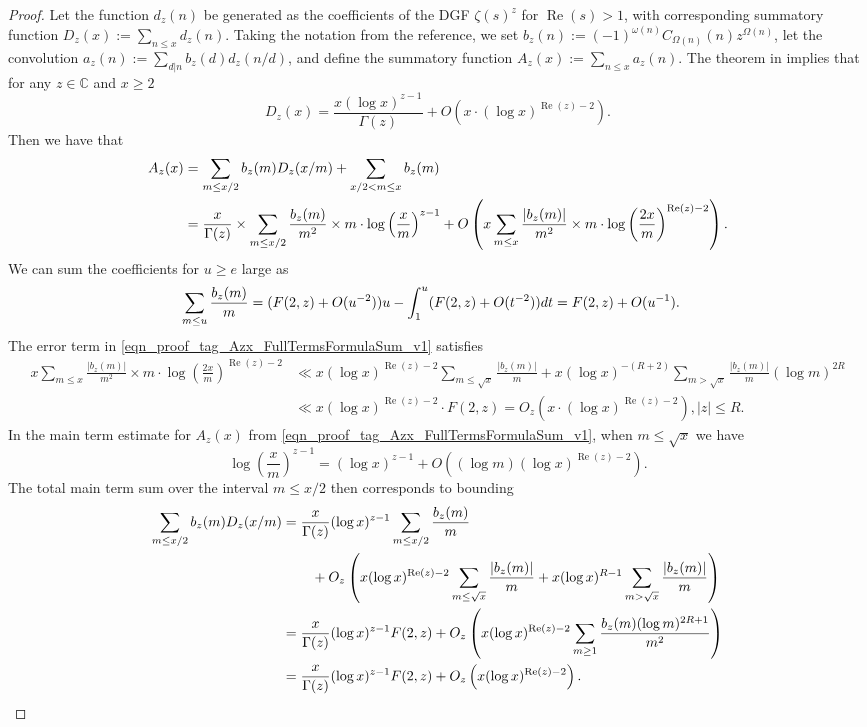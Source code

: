 \documentclass[11pt,reqno,a4letter]{article}
\numberwithin{figure}{section}
\numberwithin{table}{section}
\theoremstyle{plain}
\numberwithin{theorem}{section}
\theoremstyle{definition}
\renewcommand{\Re}{\operatorname{Re}}
\begin{document}
\begin{proof}
Let the function $d_z(n)$ be generated as the coefficients of the DGF 
$\zeta(s)^{z}$ for $\Re(s) > 1$, with corresponding 
summatory function $D_z(x) := \sum_{n \leq x} d_z(n)$. 
Taking the notation from the reference, we set 
$b_z(n) := (-1)^{\omega(n)} C_{\Omega(n)}(n) z^{\Omega(n)}$, let the convolution 
$a_z(n) := \sum_{d|n} b_z(d) d_z(n/d)$, and define the summatory function 
$A_z(x) := \sum_{n \leq x} a_z(n)$. 
The theorem in \cite[Thm.\ 7.17; \S 7.4]{MV} implies that for any $z \in \mathbb{C}$ and $x \geq 2$ 
\[
D_z(x) = \frac{x (\log x)^{z-1}}{\Gamma(z)} + O\left(x \cdot (\log x)^{\Re(z)-2}\right). 
\]
Then we have that 
\begin{align} 
\notag 
A_z(x) & = \sum_{m \leq x/2} b_z(m) D_z(x/m) + \sum_{x/2 < m \leq x} b_z(m) \\ 
\label{eqn_proof_tag_Azx_FullTermsFormulaSum_v1} 
     & = \frac{x}{\Gamma(z)} \times \sum_{m \leq x/2} 
     \frac{b_z(m)}{m^2} \times m \cdot \log\left(\frac{x}{m}\right)^{z-1} + 
     O\left(x \sum_{m \leq x} \frac{|b_z(m)|}{m^2} \times m \cdot 
     \log\left(\frac{2x}{m}\right)^{\Re(z) - 2}\right). 
\end{align} 
We can sum the coefficients for $u \geq e$ large as 
\begin{align} 
\notag 
\sum_{m \leq u} \frac{b_z(m)}{m} & = (F(2, z) + O(u^{-2})) u - \int_1^{u} 
     (F(2, z) + O(t^{-2})) dt 
     = F(2, z) + O(u^{-1}). 
\end{align} 
The error term in \eqref{eqn_proof_tag_Azx_FullTermsFormulaSum_v1} satisfies 
\begin{align*} 
x \sum_{m \leq x} \frac{|b_z(m)|}{m^2} \times m \cdot 
     \log\left(\frac{2x}{m}\right)^{\Re(z) - 2} & \ll 
     x (\log x)^{\Re(z) - 2} \sum_{m \leq \sqrt{x}} \frac{|b_z(m)|}{m} + 
     x (\log x)^{-(R+2)} \sum_{m > \sqrt{x}} \frac{|b_z(m)|}{m} (\log m)^{2R} \\ 
     & \ll x (\log x)^{\Re(z) - 2} \cdot F(2, z) 
     = O_z\left(x \cdot (\log x)^{\Re(z) - 2}\right), |z| \leq R. 
\end{align*} 
In the main term estimate for $A_z(x)$ from 
\eqref{eqn_proof_tag_Azx_FullTermsFormulaSum_v1}, when $m \leq \sqrt{x}$ we have 
\[
\log\left(\frac{x}{m}\right)^{z-1} = (\log x)^{z-1} + 
     O\left((\log m) (\log x)^{\Re(z) - 2}\right). 
\]
The total main term sum over the interval $m \leq x/2$ then corresponds to bounding 
\begin{align*} 
\sum_{m \leq x/2} b_z(m) D_z(x/m) & = \frac{x}{\Gamma(z)} (\log x)^{z-1} 
     \sum_{m \leq x/2} \frac{b_z(m)}{m} \\ 
     & \phantom{=\quad\ } + 
     O_z\left(x (\log x)^{\Re(z)-2} \sum_{m \leq \sqrt{x}} \frac{|b_z(m)|}{m} + 
     x (\log x)^{R-1} \sum_{m > \sqrt{x}} \frac{|b_z(m)|}{m}\right) \\ 
     & = \frac{x}{\Gamma(z)} (\log x)^{z-1} F(2, z) + O_z\left( 
     x (\log x)^{\Re(z)-2} \sum_{m \geq 1} \frac{b_z(m) (\log m)^{2R+1}}{m^2} 
     \right) \\ 
     & = \frac{x}{\Gamma(z)} (\log x)^{z-1} F(2, z) + O_z\left( 
     x (\log x)^{\Re(z)-2}\right). 
     \qedhere  
\end{align*} 
\end{proof} 
\end{document}
